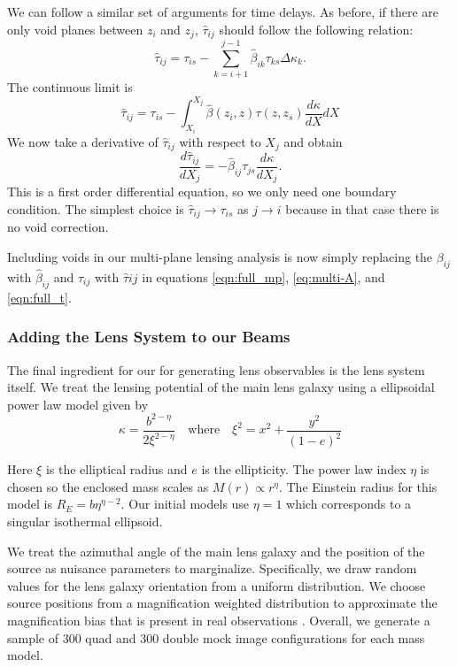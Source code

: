 \documentclass{emulateapj}
\newcommand\betahat{\hat{\beta}}
\newcommand\tauhat{\hat{\tau}}
\begin{document}
We can follow a similar set of arguments for time delays. As before, if there are only void planes between $z_i$ and $z_j$, $\tauhat_{i j}$ should follow the following relation:
\begin{equation}
\tauhat_{i j} = \tau_{i s} - \sum\limits_{k = i + 1}^{j - 1}\betahat_{i k} \tau_{k s} \Delta \kappa_k.
\end{equation}
The continuous limit is
\begin{equation}
\tauhat_{i j}  = \tau_{i s} - \int_{X_i}^{X_j} \betahat(z_i, z) \tau(z, z_s) \frac{d \kappa}{d X} dX
\end{equation}
We now take a derivative of $\tauhat_{i j}$ with respect to $X_j$ and obtain
\begin{equation}
\frac{d \tauhat_{i j}}{d X_j}  = -\betahat_{i j} \tau_{j s} \frac{d \kappa}{d X_j}. 
\end{equation}
This is a first order differential equation, so we only need one boundary condition. The simplest choice is $\tauhat_{i j} \rightarrow \tau_{i s}$ as $j \rightarrow i$ because in that case there is no void correction.  

Including voids in our multi-plane lensing analysis is now simply replacing the $\beta_{i j}$ with $\betahat_{i j}$ and $\tau_{i j}$ with $\tauhat{i j}$ in equations \ref{eqn:full_mp}, \ref{eq:multi-A}, and \ref{eqn:full_t}.

\subsubsection{Adding the Lens System to our Beams}
The final ingredient for our for generating lens observables is the lens system itself. We treat the lensing potential of the main lens galaxy using a ellipsoidal power law model given by
\begin{equation}
\label{eqn:powerlaw}
\kappa = \frac{b^{2-\eta}}{2 \xi^{2-\eta}}
\quad\mbox{where}\quad
\xi^2 = x^2 + \frac{y^2}{(1-e)^2}
\end{equation}

Here $\xi$ is the elliptical radius and $e$ is the ellipticity.  The power law index $\eta$ is chosen so the enclosed mass scales as $M(r) \propto r^\eta$.
The Einstein radius for this model is $R_E = b \eta^{\eta - 2}$. Our initial models use $\eta = 1$ which corresponds to a singular isothermal ellipsoid.

We treat the azimuthal angle of the main lens galaxy and the position of the source as nuisance parameters to marginalize.  Specifically, we draw random values for the lens galaxy orientation from a uniform distribution.  We choose source positions from a magnification weighted distribution to approximate the magnification bias that is present in real observations \citep[see][]{Keeton04}. Overall, we generate a sample of 300 quad and 300 double mock image configurations for each mass model.
\end{document}
